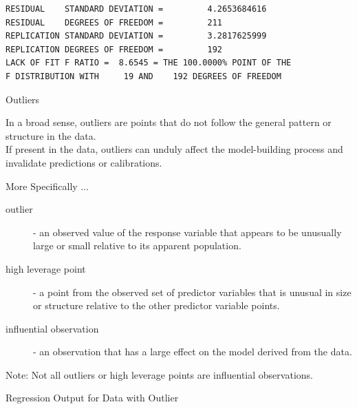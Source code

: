 {{{\begin{verbatim}
RESIDUAL    STANDARD DEVIATION =         4.2653684616
RESIDUAL    DEGREES OF FREEDOM =         211
REPLICATION STANDARD DEVIATION =         3.2817625999
REPLICATION DEGREES OF FREEDOM =         192
LACK OF FIT F RATIO =  8.6545 = THE 100.0000% POINT OF THE
F DISTRIBUTION WITH     19 AND    192 DEGREES OF FREEDOM
\end{verbatim}
}
\clearpage
\begin{figure}
\end{figure}
\clearpage
\newpage
{}
\begin{center}
Outliers
\end{center}
\vspace{0.5in}
In a broad sense, outliers are points that do 
not follow the general pattern or structure in the data. \\
\vspace{0.5in}
If present in the data, outliers can unduly affect
the model-building process and invalidate
predictions or calibrations. \\
\newpage
\begin{center}
More Specifically $\ldots$
\end{center}
\vspace{0.5in}
\begin{description}
\item[outlier] - an observed value of the response variable that
appears to be unusually large or small relative to its apparent population.
\vspace{0.15in}
\item[high leverage point] - a point from the observed set of predictor
variables that is unusual in size or structure relative to the other 
predictor variable points. 
\vspace{0.15in}
\item[influential observation] - an observation that has a large effect on
the model derived from the data.
\end{description}
\vspace{0.5in}
Note: Not all outliers or high leverage points are influential observations.
\begin{figure}
\end{figure}
\clearpage
\begin{center}
Regression Output for Data with Outlier
\end{center}
{\large
\begin{verbatim}


\end{verbatim}}}}
